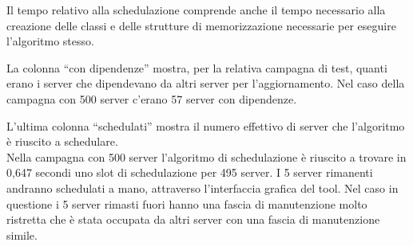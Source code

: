 Il tempo relativo alla schedulazione comprende anche il tempo necessario 
alla creazione delle classi e delle strutture di memorizzazione 
necessarie per eseguire l'algoritmo stesso.


La colonna “con dipendenze” mostra, per la relativa campagna di test, quanti 
erano i server che dipendevano da altri server per l’aggiornamento. Nel caso 
della campagna con 500 server c’erano 57 server con dipendenze.

L’ultima colonna “schedulati” mostra il numero effettivo di server che 
l’algoritmo è riuscito a schedulare.\\

Nella campagna con 500 server 
l’algoritmo di schedulazione è riuscito a trovare in 0,647 secondi uno slot 
di schedulazione per 495 server. I 5 server rimanenti andranno schedulati a 
mano, attraverso l’interfaccia grafica del tool. Nel caso in questione i 5 server 
rimasti fuori hanno una fascia di manutenzione molto ristretta che è stata 
occupata da altri server con una fascia di manutenzione simile.
